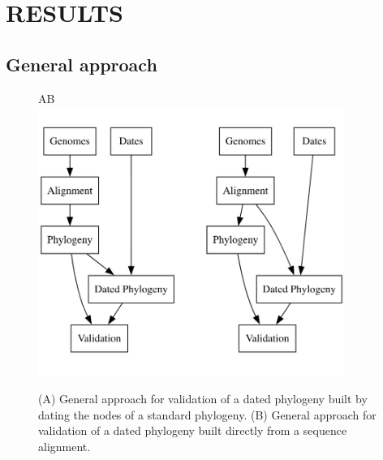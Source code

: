 \documentclass{article}
\begin{document}
\section*{RESULTS}

\subsection*{General approach}

\begin{figure}[t!]
\begin{center}
A\hspace*{6cm}B\hspace*{6cm}~\\
\includegraphics[width=10cm]{fig1.png}
\end{center}
\caption{(A) General approach for validation of a dated phylogeny built by dating the nodes of a standard phylogeny. (B) General approach for validation of a dated phylogeny built directly from a sequence alignment.
\label{fig:approach}}
\end{figure}
\end{document}
